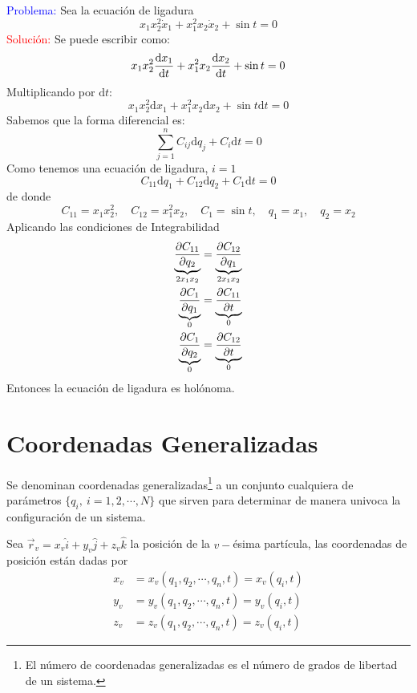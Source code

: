 \documentclass[../main]{subfiles}
\begin{document}
\textcolor{blue}{Problema:} Sea la ecuación de ligadura
\begin{equation*}
    x_1 x^2_2\dot{x}_1+x^2_1 x_2 \dot{x}_2+\sin t=0
\end{equation*}
\textcolor{red}{Solución:} Se puede escribir como:
\begin{equation*}
    x_1 x^2_2 \dv{x_1}{t}+x^2_1 x_2 \dv{x_2}{t}+\sin t=0
\end{equation*}
Multiplicando por $\mathrm{d}t$:
\begin{equation*}
    x_1 x^2_2 \mathrm{d}x_1+x^2_1 x_2 \mathrm{d}x_2+\sin t \mathrm{d}t=0
\end{equation*}
Sabemos que la forma diferencial es:
\begin{equation*}
    \sum_{j=1}^n C_{ij} \mathrm{d}q_j+C_i \mathrm{d}t=0
\end{equation*}
Como tenemos una ecuación de ligadura, $i=1$
\begin{equation*}
    C_{11}\mathrm{d}q_1+C_{12}\mathrm{d}q_2+C_1\mathrm{d}t=0
\end{equation*}
de donde
\begin{equation*}
    C_{11}=x_1x^2_2,\quad C_{12}=x^2_1x_2,\quad C_1=\sin t,\quad q_1=x_1, \quad q_2=x_2
\end{equation*}
Aplicando las condiciones de Integrabilidad
\begin{align*}
    \underbrace{\pdv{C_{11}}{q_2}}_{2x_1x_2}&=\underbrace{\pdv{C_{12}}{q_1}}_{2x_1x_2} \\
    \underbrace{\pdv{C_1}{q_1}}_{0}&=\underbrace{\pdv{C_{11}}{t}}_{0}\\
    \underbrace{\pdv{C_1}{q_2}}_{0}&=\underbrace{\pdv{C_{12}}{t}}_{0}
\end{align*}
Entonces la ecuación de ligadura es holónoma.

\section{Coordenadas Generalizadas}\label{sec4}

Se denominan coordenadas generalizadas\footnote{El número de coordenadas generalizadas es el número de grados de libertad de un sistema.} a un conjunto cualquiera de parámetros $\{ q_i, \ i=1,2,\cdots, N\}$ que sirven para determinar de manera univoca la configuración de un sistema.

Sea $\vec{r}_v=x_v\hat{i}+y_v\hat{j}+z_v\hat{k}$ la posición de la $v-$ésima partícula, las coordenadas de posición están dadas por
\begin{equation}
    \begin{split}
        x_v&=x_v(q_1, q_2, \cdots, q_n, t)=x_v(q_i, t)\\
        y_v&=y_v(q_1, q_2, \cdots, q_n, t)=y_v(q_i, t)\\
        z_v&=z_v(q_1, q_2, \cdots, q_n, t)=z_v(q_i, t)
    \end{split}
\end{equation}
\end{document}
